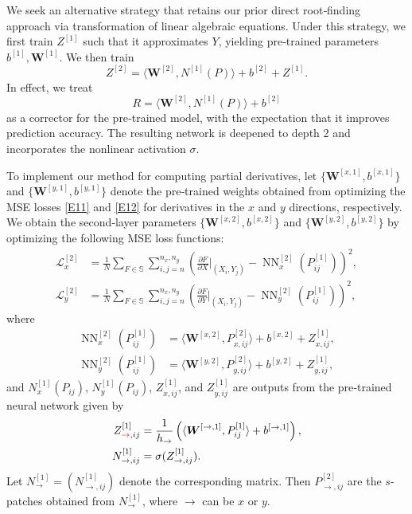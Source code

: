 \documentclass[pdflatex,sn-mathphys-num]{sn-jnl}%
\newcommand{\rev}[1]{\textcolor{red}{#1}}
\theoremstyle{thmstyleone}%
\theoremstyle{thmstyletwo}%
\theoremstyle{thmstylethree}%
\begin{document}
{We seek an alternative strategy that retains our prior direct root‑finding approach via transformation of linear algebraic equations. Under this strategy, we first train $Z^{[1]}$ such that it approximates $Y$, yielding pre‑trained parameters $b^{[1]},\boldsymbol{W}^{[1]}$. We then train
\[
Z^{[2]}=\langle\boldsymbol{W}^{[2]}, N^{[1]}(P)\rangle + b^{[2]}+Z^{[1]}.
\]
In effect, we treat
\[
R=\langle\boldsymbol{W}^{[2]}, N^{[1]}(P)\rangle + b^{[2]}
\]
as a corrector for the pre‑trained model, with the expectation that it improves prediction accuracy. The resulting network is deepened to depth 2 and incorporates the nonlinear activation $\sigma$.

To implement our method for computing partial derivatives, let $\{\boldsymbol{W}^{[x,1]},b^{[x,1]}\}$ and $\{\boldsymbol{W}^{[y,1]},b^{[y,1]}\}$ denote the pre‑trained weights obtained from optimizing the MSE losses \eqref{E11} and \eqref{E12} for derivatives in the $x$ and $y$ directions, respectively. We obtain the second‑layer parameters $\{\boldsymbol{W}^{[x,2]},b^{[x,2]}\}$ and $\{\boldsymbol{W}^{[y,2]},b^{[y,2]}\}$ by optimizing the following MSE loss functions:
\begin{align}
\mathcal{L}_x^{[2]} &= \frac{1}{N}\sum_{F\in\mathbb{S}}\sum_{i,j=n}^{n_x,n_y} \left( \frac{\partial F}{\partial X}\bigg|_{(X_i,Y_j)} - \operatorname{NN}^{[2]}_x(P_{ij}^{[1]})  \right)^{\!2},\label{E27}\\
\mathcal{L}_y^{[2]} &= \frac{1}{N}\sum_{F\in\mathbb{S}}\sum_{i,j=n}^{n_x,n_y} \left( \frac{\partial F}{\partial Y}\bigg|_{(X_i,Y_j)} - \operatorname{NN}^{[2]}_y(P_{ij}^{[1]}) \right)^{\!2},\label{E28}
\end{align}
where
\begin{align}
\operatorname{NN}^{[2]}_x(P_{ij}^{[1]}) &= \langle\boldsymbol{W}^{[x,2]}, P_{x,ij}^{[2]}\rangle + b^{[x,2]}+Z_{x,ij}^{[1]},\\
\operatorname{NN}^{[2]}_y(P_{ij}^{[1]}) &= \langle\boldsymbol{W}^{[y,2]}, P_{y,ij}^{[2]}\rangle + b^{[y,2]}+Z_{y,ij}^{[1]},
\end{align}
and $N_x^{[1]}(P_{ij})$, $N_y^{[1]}(P_{ij})$, $Z_{x,ij}^{[1]}$, and $Z_{y,ij}^{[1]}$ are outputs from the pre‑trained neural network given by
\begin{align}
Z_{\rev{\to},ij}^{[1]} &=\frac{1}{h_{\to}} \left(\langle\boldsymbol{W}^{[\to,1]}, P_{ij}^{[1]}\rangle + b^{[\to,1]}\right),\\
N_{\to,ij}^{[1]} &= \sigma(Z_{\to,ij}^{[1]}).
\end{align}
Let $N_{\to}^{[1]}=(N_{\to,ij}^{[1]})$ denote the corresponding matrix. Then $P_{\to,ij}^{[2]}$ are the $s$-patches obtained from $N_{\to}^{[1]}$, where $\to$ can be $x$ or $y$.

}
\end{document}
